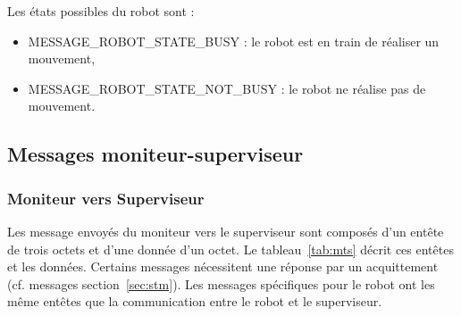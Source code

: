 \begin{appendices}
Les états possibles du robot sont :
\begin{itemize}
	\item MESSAGE\_ROBOT\_STATE\_BUSY : le robot est en train de réaliser un mouvement,
	\item MESSAGE\_ROBOT\_STATE\_NOT\_BUSY : le robot ne réalise pas de mouvement.
\end{itemize}


\subsection{Messages moniteur-superviseur}
\label{sec:comm_mon_sup}

\subsubsection{Moniteur vers Superviseur}
\label{sec:mts}

Les message envoyés du moniteur vers le superviseur sont composés d'un entête de trois octets et d'une donnée d'un octet. Le tableau~\ref{tab:mts} décrit ces entêtes et les données. Certains messages nécessitent une réponse par un acquittement (cf. messages section~\ref{sec:stm}). Les messages spécifiques pour le robot ont les même entêtes que la communication entre le robot et le superviseur.


\begin{table}[htp]


\end{table}
\end{appendices}
